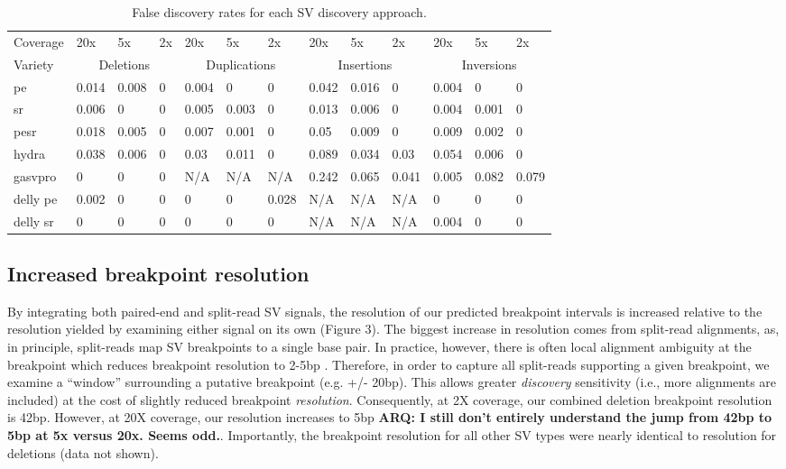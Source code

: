 \documentclass[11pt]{article}
\begin{document}
\begin{table}[h!b!p!]
\small
\caption{False discovery rates for each SV discovery approach.}
\begin{tabular}{l|lll|lll|lll|lll}
		Coverage
		&20x&5x&2x &20x&5x&2x &20x&5x&2x &20x&5x&2x \\
\cline{1-13}
			Variety
			&\multicolumn{3}{c}{Deletions} 
			&\multicolumn{3}{|c}{Duplications} 
			&\multicolumn{3}{|c}{Insertions}
			&\multicolumn{3}{|c}{Inversions} \\
\cline{1-13}
pe		&0.014&0.008&0&0.004&0	  &0    &0.042&0.016&0	  &0.004&0	  &0 \\
sr      &0.006&0	&0&0.005&0.003&0	&0.013&0.006&0	  &0.004&0.001&0 \\
pesr    &0.018&0.005&0&0.007&0.001&0	&0.05 &0.009&0	  &0.009&0.002&0 \\
hydra   &0.038&0.006&0&0.03 &0.011&0	&0.089&0.034&0.03 &0.054&0.006&0 \\
gasvpro &0	  &0	&0&N/A  &N/A  &N/A  &0.242&0.065&0.041&0.005&0.082&0.079 \\
delly pe&0.002&0	&0&0	&0	  &0.028&N/A  &N/A	&N/A  &0	&0	  &0 \\
delly sr&0	  &0	&0&0	&0	  &0	&N/A  &N/A	&N/A  &0.004&0	  &0 \\ 

\end{tabular}
\label{table:fdr}
\end{table}


\subsection{Increased breakpoint resolution}
By integrating both paired-end and split-read SV signals, the resolution of
our predicted breakpoint intervals is increased relative to the resolution 
yielded by examining either signal on its own (Figure 3). The biggest increase
in resolution comes from split-read alignments, as, in principle, split-reads
map SV breakpoints to a single base pair. In practice, however, there is
often local alignment ambiguity at the breakpoint which reduces breakpoint 
resolution to 2-5bp \cite{quinlan2010b}. Therefore, in order to capture all
split-reads supporting a given breakpoint, we examine a ``window'' surrounding
a putative breakpoint (e.g. +/- 20bp). This allows greater \emph{discovery}
sensitivity (i.e., more alignments are included) at the cost of slightly reduced
breakpoint \emph{resolution}. Consequently, at 2X coverage, our combined
deletion breakpoint resolution is 42bp. However, at 20X coverage, our resolution
increases to 5bp \textbf{ARQ: I still don't entirely understand the jump from
42bp to 5bp at 5x versus 20x.  Seems odd.}. Importantly, the breakpoint 
resolution for all other SV types were nearly identical to resolution for 
deletions (data not shown).
\end{document}
